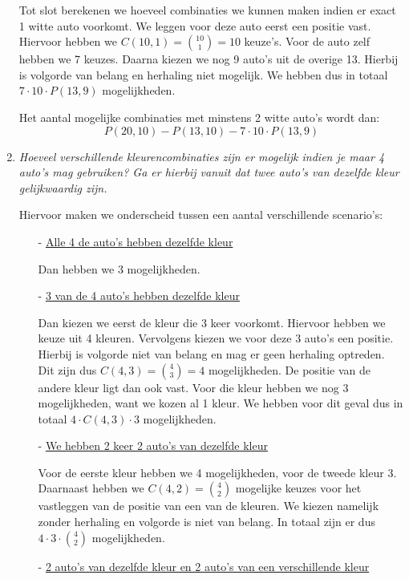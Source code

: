 \documentclass[kulak]{kulakarticle} %
\begin{document}
\begin{enumerate}
		Tot slot berekenen we hoeveel combinaties we kunnen maken indien er exact 1 witte auto voorkomt. We leggen voor deze auto eerst een positie vast. Hiervoor hebben we \(C(10,1)={10 \choose 1}=10\) keuze's. Voor de auto zelf hebben we 7 keuzes. Daarna kiezen we nog 9 auto's uit de overige 13. Hierbij is volgorde van belang en herhaling niet mogelijk. We hebben dus in totaal \(7\cdot 10\cdot P(13,9)\) mogelijkheden.

		Het aantal mogelijke combinaties met minstens 2 witte auto's wordt dan: \[P(20,10) - P(13,10) - 7\cdot 10\cdot P(13,9)\]

		\newpage

		\item \textit{Hoeveel verschillende kleurencombinaties zijn er mogelijk indien je maar 4 auto's mag gebruiken? Ga er hierbij vanuit dat twee auto's van dezelfde kleur gelijkwaardig zijn.}

		Hiervoor maken we onderscheid tussen een aantal verschillende scenario's:

		\begin{itemize}
			\item[-] \underline{Alle 4 de auto's hebben dezelfde kleur}

			Dan hebben we 3 mogelijkheden.

			\item[-] \underline{3 van de 4 auto's hebben dezelfde kleur}

			Dan kiezen we eerst de kleur die 3 keer voorkomt. Hiervoor hebben we keuze uit 4 kleuren. Vervolgens kiezen we voor deze 3 auto's een positie. Hierbij is volgorde niet van belang en mag er geen herhaling optreden. Dit zijn dus \(C(4,3)={4 \choose 3}=4\) mogelijkheden. De positie van de andere kleur ligt dan ook vast. Voor die kleur hebben we nog 3 mogelijkheden, want we kozen al 1 kleur. We hebben voor dit geval dus in totaal \(4 \cdot C(4,3) \cdot 3 \) mogelijkheden.

			\item[-] \underline{We hebben 2 keer 2 auto's van dezelfde kleur}

			Voor de eerste kleur hebben we 4 mogelijkheden, voor de tweede kleur 3. Daarnaast hebben we \(C(4,2)={4\choose 2}\) mogelijke keuzes voor het vastleggen van de positie van een van de kleuren. We kiezen namelijk zonder herhaling en volgorde is niet van belang. In totaal zijn er dus \(4 \cdot 3 \cdot {4 \choose 2}\) mogelijkheden.

			\item[-] \underline{2 auto's van dezelfde kleur en 2 auto's van een verschillende kleur}


\end{itemize}
\end{enumerate}
\end{document}
